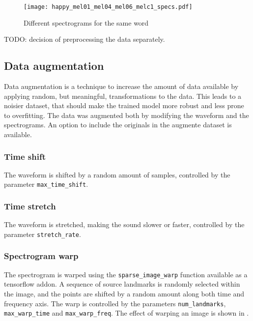 \begin{figure}[t!]
    \centering
    \texttt{[image: happy\_mel01\_mel04\_mel06\_melc1\_specs.pdf]}
    \caption{Different spectrograms for the same word}%
    \label{fig:happy_mel01_mel04_mel06_melc1_specs}
\end{figure}

TODO: decision of preprocessing the data separately.

\subsection{Data augmentation}
\label{sec:data_augmentation}

Data augmentation is a technique to increase the amount of data available by
applying random, but meaningful, transformations to the data. This leads to a
noisier dataset, that should make the trained model more robust and less prone
to overfitting. The data was augmented both by modifying the waveform and the
spectrograms. An option to include the originals in the augmente dataset is
available.

\subsubsection{Time shift}

The waveform is shifted by a random amount of samples, controlled by the
parameter \texttt{max\_time\_shift}.

\subsubsection{Time stretch}

The waveform is stretched, making the sound slower or faster, controlled by the
parameter \texttt{stretch\_rate}.

\subsubsection{Spectrogram warp}

The spectrogram is warped using the \texttt{sparse\_image\_warp} function
available as a tensorflow addon.
A sequence of source landmarks is randomly selected within the image, and the
points are shifted by a random amount along both time and frequency axis. The
warp is controlled by the parameters \texttt{num\_landmarks},
\texttt{max\_warp\_time} and \texttt{max\_warp\_freq}.
The effect of warping an image is shown in .

